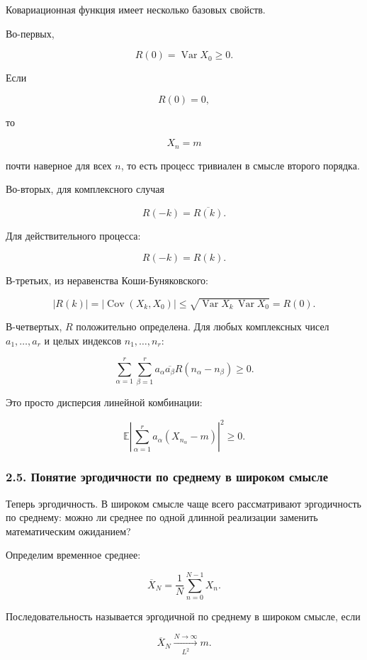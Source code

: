 \documentclass[
  11pt,
  a4paper,
]{article}
\begin{document}
Ковариационная функция имеет несколько базовых свойств.

Во-первых,

\[
R(0)=\operatorname{Var}X_0\ge0.
\]

Если

\[
R(0)=0,
\]

то

\[
X_n=m
\]

почти наверное для всех \(n\), то есть процесс тривиален в смысле
второго порядка.

Во-вторых, для комплексного случая

\[
R(-k)=\overline{R(k)}.
\]

Для действительного процесса:

\[
R(-k)=R(k).
\]

В-третьих, из неравенства Коши-Буняковского:

\[
|R(k)|
=
|\operatorname{Cov}(X_k,X_0)|
\le
\sqrt{\operatorname{Var}X_k\,\operatorname{Var}X_0}
=
R(0).
\]

В-четвертых, \(R\) положительно определена. Для любых комплексных чисел
\(a_1,\ldots,a_r\) и целых индексов \(n_1,\ldots,n_r\):

\[
\sum_{\alpha=1}^r\sum_{\beta=1}^r
a_\alpha \overline{a_\beta}R(n_\alpha-n_\beta)
\ge0.
\]

Это просто дисперсия линейной комбинации:

\[
\mathbb E\left|
\sum_{\alpha=1}^r a_\alpha (X_{n_\alpha}-m)
\right|^2
\ge0.
\]

\subsubsection{2.5. Понятие эргодичности по среднему в широком
смысле}\label{ux43fux43eux43dux44fux442ux438ux435-ux44dux440ux433ux43eux434ux438ux447ux43dux43eux441ux442ux438-ux43fux43e-ux441ux440ux435ux434ux43dux435ux43cux443-ux432-ux448ux438ux440ux43eux43aux43eux43c-ux441ux43cux44bux441ux43bux435}

Теперь эргодичность. В широком смысле чаще всего рассматривают
эргодичность по среднему: можно ли среднее по одной длинной реализации
заменить математическим ожиданием?

Определим временное среднее:

\[
\overline X_N
=
\frac1N\sum_{n=0}^{N-1}X_n.
\]

Последовательность называется эргодичной по среднему в широком смысле,
если

\[
\overline X_N
\xrightarrow[L^2]{N\to\infty}
m.
\]
\end{document}
